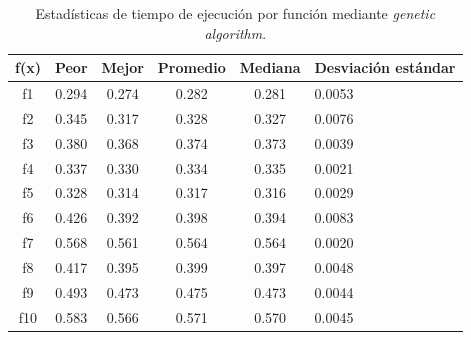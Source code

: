 \documentclass[12pt,twoside]{report}
\begin{document}
	
	\begin{table}[H]
		\centering
		\begin{tabular}{|c|c|c|c|c|p{2.1cm}|}  
			\hline
			\textbf{f(x)} & \textbf{Peor} & \textbf{Mejor} & \textbf{Promedio} & \textbf{Mediana} & \textbf{Desviación estándar} \\  
			\hline
			f1  & 0.294 & 0.274 & 0.282 & 0.281 & 0.0053 \\ 
			f2  & 0.345 & 0.317 & 0.328 & 0.327 & 0.0076 \\ 
			f3  & 0.380 & 0.368 & 0.374 & 0.373 & 0.0039 \\ 
			f4  & 0.337 & 0.330 & 0.334 & 0.335 & 0.0021 \\ 
			f5  & 0.328 & 0.314 & 0.317 & 0.316 & 0.0029 \\ 
			f6  & 0.426 & 0.392 & 0.398 & 0.394 & 0.0083 \\ 
			f7  & 0.568 & 0.561 & 0.564 & 0.564 & 0.0020 \\ 
			f8  & 0.417 & 0.395 & 0.399 & 0.397 & 0.0048 \\ 
			f9  & 0.493 & 0.473 & 0.475 & 0.473 & 0.0044 \\ 
			f10 & 0.583 & 0.566 & 0.571 & 0.570 & 0.0045 \\
			\hline
		\end{tabular}
		\caption{Estadísticas de tiempo de ejecución por función mediante \textit{genetic algorithm}.}
		\label{tab:res_cec_time_ga}
	\end{table}
\end{document}
